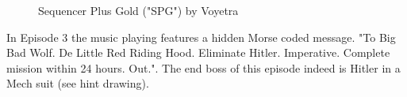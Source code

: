 \documentclass[book.tex]{subfiles}
\begin{document}
\begin{figure}[H]
\centering
\caption{Sequencer Plus Gold ("SPG") by Voyetra}
\end{figure}



 In Episode 3 the music playing features a hidden Morse coded message. "To Big Bad Wolf. De Little Red Riding Hood. Eliminate Hitler. Imperative. Complete mission within 24 hours. Out.". The end boss of this episode indeed is Hitler in a Mech suit (see hint drawing).
\end{document}
